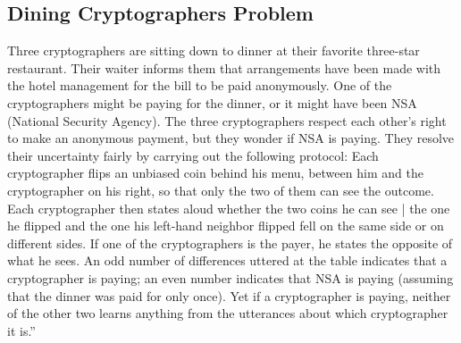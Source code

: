 \documentclass[11pt]{article}
\theoremstyle{plain}
\begin{document}
\subsection{Dining Cryptographers Problem}

Three cryptographers are sitting down to dinner at their favorite
three-star restaurant. Their waiter informs them that arrangements
have been made with the hotel management for the bill to be paid anonymously.
One of the cryptographers might be paying for the dinner, or it might
have been NSA (National Security Agency). The three cryptographers
respect each other's right to make an anonymous payment, but they
wonder if NSA is paying. They resolve their uncertainty fairly by
carrying out the following protocol: Each cryptographer flips an unbiased
coin behind his menu, between him and the cryptographer on his right,
so that only the two of them can see the outcome. Each cryptographer
then states aloud whether the two coins he can see | the one he flipped
and the one his left-hand neighbor flipped fell on the same side or
on different sides. If one of the cryptographers is the payer, he
states the opposite of what he sees. An odd number of differences
uttered at the table indicates that a cryptographer is paying; an
even number indicates that NSA is paying (assuming that the dinner
was paid for only once). Yet if a cryptographer is paying, neither
of the other two learns anything from the utterances about which cryptographer
it is.''
\end{document}
